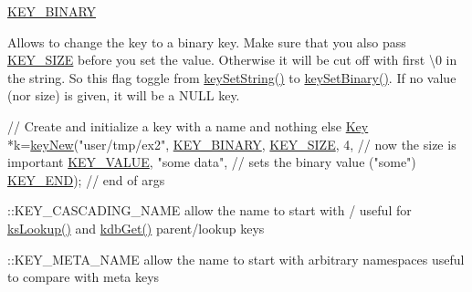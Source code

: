 \begin{DoxyItemize}
\item \hyperlink{group__key_gga91fb3178848bd682000958089abbaf40a1ca18d4e094ae7487d35ecedda2235ff}{K\-E\-Y\-\_\-\-B\-I\-N\-A\-R\-Y} \par
 Allows to change the key to a binary key. Make sure that you also pass \hyperlink{group__key_gga91fb3178848bd682000958089abbaf40a6d531b5c41445d19d0452eebdccbfa01}{K\-E\-Y\-\_\-\-S\-I\-Z\-E} before you set the value. Otherwise it will be cut off with first \textbackslash{}0 in the string. So this flag toggle from \hyperlink{group__keyvalue_ga622bde1eb0e0c4994728331326340ef2}{key\-Set\-String()} to \hyperlink{group__keyvalue_gaa50a5358fd328d373a45f395fa1b99e7}{key\-Set\-Binary()}. If no value (nor size) is given, it will be a N\-U\-L\-L key. 
\begin{DoxyCodeInclude}
\textcolor{comment}{// Create and initialize a key with a name and nothing else}
\hyperlink{classkdb_1_1Key_a5679f5cae63caddd64a60388b9cc77fa}{Key} *k=\hyperlink{group__key_gad23c65b44bf48d773759e1f9a4d43b89}{keyNew}(\textcolor{stringliteral}{"user/tmp/ex2"},
        \hyperlink{group__key_gga91fb3178848bd682000958089abbaf40a1ca18d4e094ae7487d35ecedda2235ff}{KEY\_BINARY},
        \hyperlink{group__key_gga91fb3178848bd682000958089abbaf40a6d531b5c41445d19d0452eebdccbfa01}{KEY\_SIZE}, 4,               \textcolor{comment}{// now the size is important}
        \hyperlink{group__key_gga91fb3178848bd682000958089abbaf40ac66e4a49d09212b79f5754ca6db5bd2e}{KEY\_VALUE}, \textcolor{stringliteral}{"some data"},    \textcolor{comment}{// sets the binary value ("some")}
        \hyperlink{group__key_gga91fb3178848bd682000958089abbaf40aa8adb6fcb92dec58fb19410eacfdd403}{KEY\_END});                  \textcolor{comment}{// end of args}
\end{DoxyCodeInclude}

\item \-::\-K\-E\-Y\-\_\-\-C\-A\-S\-C\-A\-D\-I\-N\-G\-\_\-\-N\-A\-M\-E allow the name to start with / useful for \hyperlink{group__keyset_gaa34fc43a081e6b01e4120daa6c112004}{ks\-Lookup()} and \hyperlink{group__kdb_ga28e385fd9cb7ccfe0b2f1ed2f62453a1}{kdb\-Get()} parent/lookup keys
\item \-::\-K\-E\-Y\-\_\-\-M\-E\-T\-A\-\_\-\-N\-A\-M\-E allow the name to start with arbitrary namespaces useful to compare with meta keys
\end{DoxyItemize}

